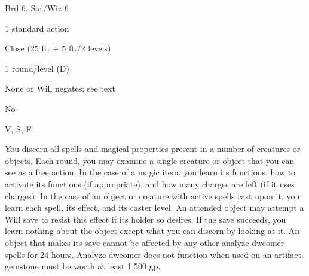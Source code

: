 
\begin{description*}
\item[Level:] Brd 6, Sor/Wiz 6
\item[Casting Time:] 1 standard action
\item[Range:] Close (25 ft. + 5 ft./2 levels)
\item[Duration:] 1 round/level (D)
\item[Saving Throw:] None or Will negates; see text
\item[Spell Resistance:] No
\item[Components:] V, S, F
\end{description*}

You discern all spells and magical properties present in a number of creatures
or objects. Each round, you may examine a single creature or object that you can
see as a free action. In the case of a magic item, you learn its functions, how
to activate its functions (if appropriate), and how many charges are left (if it
uses charges). In the case of an object or creature with active spells cast upon
it, you learn each spell, its effect, and its caster level.
An attended object may attempt a Will save to resist this effect if its holder
so desires. If the save succeeds, you learn nothing about the object except what
you can discern by looking at it. An object that makes its save cannot be affected
by any other analyze dweomer spells for 24 hours.
Analyze dweomer does not function when used on an artifact.
gemstone must be worth at least 1,500 gp.